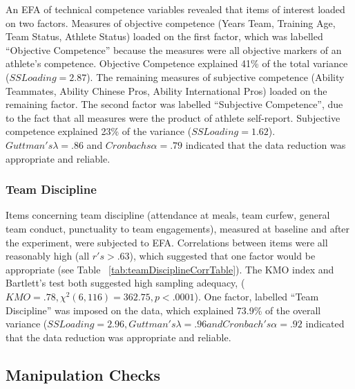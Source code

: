 An EFA of technical competence variables revealed that items of interest loaded on two factors. Measures of objective competence (Years Team, Training Age, Team Status, Athlete Status) loaded on the first factor, which was labelled ``Objective Competence'' because the measures were all objective markers of an athlete's competence.
Objective Competence explained 41\% of the total variance ($SS Loading = 2.87$).  The remaining measures of subjective competence (Ability Teammates, Ability Chinese Pros, Ability International Pros) loaded on the remaining factor.  The second factor was labelled ``Subjective Competence'', due to the fact that all measures were the product of athlete self-report.  Subjective competence explained 23\% of the variance ($SS Loading = 1.62$).  $Guttman's \lambda = .86$ and $Cronbachs \alpha = .79$ indicated that the data reduction was appropriate and reliable.


\subsubsection{Team Discipline\label{app6:teamDisciplineEFA}}
Items concerning team discipline (attendance at meals, team curfew, general team conduct, punctuality to team engagements), measured at baseline and after the experiment, were subjected to EFA.  Correlations between items were all reasonably high (all $r's > .63$), which suggested that one factor would be appropriate (see Table ~\ref{tab:teamDisciplineCorrTable}).
The KMO index and Bartlett's test both suggested high sampling adequacy, ($KMO = .78, \chi^2(6, 116) = 362.75, p < .0001$).  One factor, labelled ``Team Discipline'' was imposed on the data, which explained 73.9\% of the overall variance
($ SS Loading = 2.96, Guttman's \lambda = .96 and Cronbach's \alpha = .92$ indicated that the data reduction was appropriate and reliable.







\subsection{Manipulation Checks\label{app6:manipulationChecks}}




